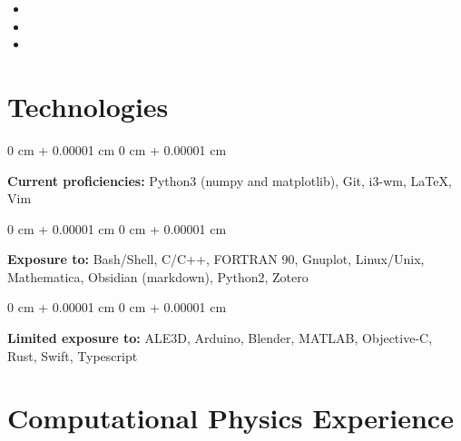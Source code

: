 \documentclass[10pt, letterpaper]{article}
\newenvironment{highlights}{
    \begin{itemize}[
        topsep=0.10 cm,
        parsep=0.10 cm,
        partopsep=0pt,
        itemsep=0pt,
        leftmargin=0 cm + 10pt
    ]
}{
    \end{itemize}
} %
\newenvironment{onecolentry}{
    \begin{adjustwidth}{
        0 cm + 0.00001 cm
    }{
        0 cm + 0.00001 cm
    }
}{
    \end{adjustwidth}
} %
\begin{document}
        \begin{onecolumnentry}
          \begin{highlights}
            \item {}
            \item {}
            \item {}
          \end{highlights}
        \end{onecolumnentry}

    \section{Technologies}

        \begin{onecolentry}
          \textbf{Current proficiencies:} Python3 (numpy and matplotlib), Git, i3-wm, \LaTeX,  Vim
        \end{onecolentry}

        \vspace{0.2 cm}

        \begin{onecolentry}
          \textbf{Exposure to:} Bash/Shell, C/C++, FORTRAN 90, Gnuplot, Linux/Unix, Mathematica, Obsidian (markdown), Python2, Zotero
        \end{onecolentry}

        \vspace{0.2 cm}

        \begin{onecolentry}
          \textbf{Limited exposure to:} ALE3D, Arduino, Blender, MATLAB, Objective-C, Rust, Swift, Typescript
        \end{onecolentry}

    \section{Computational Physics Experience}
\end{document}
